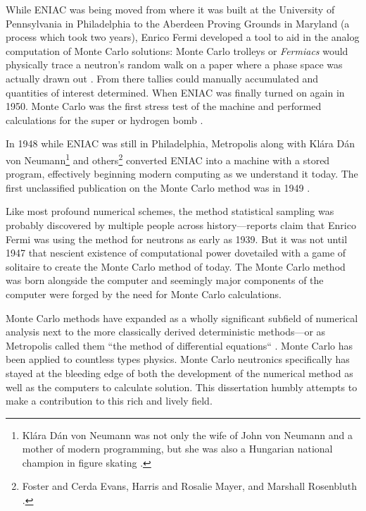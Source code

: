 While ENIAC was being moved from where it was built at the University of Pennsylvania in Philadelphia to the Aberdeen Proving Grounds in Maryland (a process which took two years), Enrico Fermi developed a tool to aid in the analog computation of Monte Carlo solutions:
Monte Carlo trolleys or \textit{Fermiacs} would physically trace a neutron's random walk on a paper where a phase space was actually drawn out \cite{metropolis_1987_history}.
From there tallies could manually accumulated and quantities of interest determined.
When ENIAC was finally turned on again in 1950. Monte Carlo was the first stress test of the machine and performed calculations for the super or hydrogen bomb \cite{metropolis_1987_history}.

In 1948 while ENIAC was still in Philadelphia, Metropolis along with Klára Dán von Neumann\footnote{
Klára Dán von Neumann was not only the wife of John von Neumann and a mother of modern programming, but she was also a Hungarian national champion in figure skating \cite{dyson_2012_digital}.}
and others\footnote{Foster and Cerda Evans, Harris and Rosalie Mayer, and Marshall Rosenbluth \cite{switman_2017_unheralded}.} converted ENIAC into a machine with a stored program, effectively beginning modern computing as we understand it today.
The first unclassified publication on the Monte Carlo method was in 1949 \cite{metropolis_1949_monteCarlo}.

Like most profound numerical schemes, the method statistical sampling was probably discovered by multiple people across history---reports claim that Enrico Fermi was using the method for neutrons as early as 1939.
But it was not until 1947 that nescient existence of computational power dovetailed with a game of solitaire to create the Monte Carlo method of today.
The Monte Carlo method was born alongside the computer and seemingly major components of the computer were forged by the need for Monte Carlo calculations.

Monte Carlo methods have expanded as a wholly significant subfield of numerical analysis next to the more classically derived deterministic methods---or as Metropolis called them ``the method of differential equations`` \cite{anderson_1986_maniac}.
Monte Carlo has been applied to countless types physics.
Monte Carlo neutronics specifically has stayed at the bleeding edge of both the development of the numerical method as well as the computers to calculate solution.
This dissertation humbly attempts to make a contribution to this rich and lively field.


